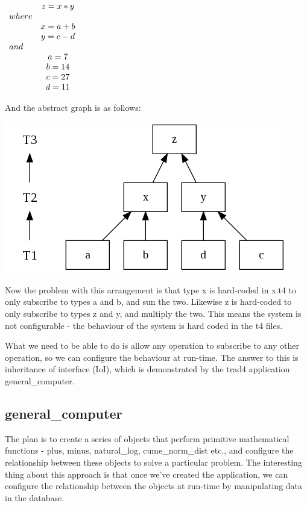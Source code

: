 \documentclass{report}
\begin{document}
\begin{math}
  \begin{array}{ l c }
        & z = x * y   \\
        where         \\
        & x = a + b   \\
        & y = c - d   \\
        and           \\
        & a = 7       \\
        & b = 14      \\
        & c = 27      \\
        & d = 11      \\
  \end{array}
\end{math}

And the abstract graph is as follows:

\includegraphics[scale=0.5]{simplemathsabstract.png}

Now the problem with this arrangement is that type x is hard-coded in x.t4 to only subscribe to types a and b, and sun the two. Likewise z is hard-coded to only subscribe to types z and y, and multiply the two. This means the system is not configurable - the behaviour of the system is hard coded in the t4 files.

What we need to be able to do is allow any operation to subscribe to any other operation, so we can configure the behaviour at run-time. The answer to this is inheritance of interface (IoI), which is demonstrated by the trad4 application general_computer.

\subsection{general_computer}

The plan is to create a series of objects that perform primitive mathematical functions - plus, minus, natural_log, cume_norm_dist etc., and configure the relationship between these objects to solve a particular problem. The interesting thing about this approach is that once we've created the application, we can configure the relationship between the objects at run-time by manipulating data in the database. 
\end{document}
